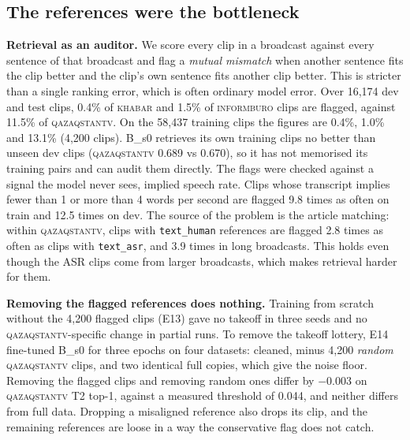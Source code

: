 \documentclass[11pt,twocolumn,a4paper]{article}
\newcommand{\src}[1]{\textsc{#1}}
\newcommand{\ib}{\src{informburo}}
\newcommand{\kh}{\src{khabar}}
\newcommand{\qz}{\src{qazaqstantv}}
\renewcommand{\paragraph}[1]{\par\smallskip\noindent\textbf{#1}\hspace{0.5em}}
\begin{document}
\subsection{The references were the bottleneck}
\label{sec:refs}

\paragraph{Retrieval as an auditor.}
We score every clip in a broadcast against every sentence of that broadcast and flag a \emph{mutual mismatch} when another sentence fits the clip better and the clip's own sentence fits another clip better. This is stricter than a single ranking error, which is often ordinary model error. Over 16{,}174 dev and test clips, 0.4\% of \kh{} and 1.5\% of \ib{} clips are flagged, against 11.5\% of \qz{}. On the 58{,}437 training clips the figures are 0.4\%, 1.0\% and 13.1\% (4{,}200 clips). B\_s0 retrieves its own training clips no better than unseen dev clips (\qz{} 0.689 vs 0.670), so it has not memorised its training pairs and can audit them directly. The flags were checked against a signal the model never sees, implied speech rate. Clips whose transcript implies fewer than 1 or more than 4 words per second are flagged 9.8 times as often on train and 12.5 times on dev. The source of the problem is the article matching: within \qz, clips with \texttt{text\_human} references are flagged 2.8 times as often as clips with \texttt{text\_asr}, and 3.9 times in long broadcasts. This holds even though the ASR clips come from larger broadcasts, which makes retrieval harder for them.

\paragraph{Removing the flagged references does nothing.}
Training from scratch without the 4{,}200 flagged clips (E13) gave no takeoff in three seeds and no \qz-specific change in partial runs. To remove the takeoff lottery, E14 fine-tuned B\_s0 for three epochs on four datasets: cleaned, minus 4{,}200 \emph{random} \qz{} clips, and two identical full copies, which give the noise floor. Removing the flagged clips and removing random ones differ by $-0.003$ on \qz{} T2 top-1, against a measured threshold of 0.044, and neither differs from full data. Dropping a misaligned reference also drops its clip, and the remaining references are loose in a way the conservative flag does not catch.
\end{document}
